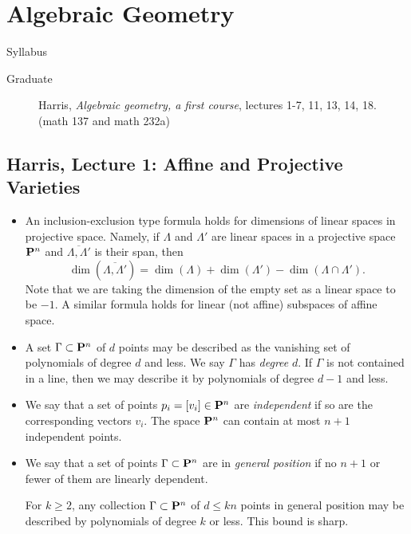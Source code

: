 \section{Algebraic Geometry}
\label{S:algebraic-geometry}

Syllabus
\begin{description}
\item[Graduate] Harris, \emph{Algebraic geometry, a first course}, lectures 1-7, 11, 13, 14, 18. (math 137 and math 232a)
\end{description}

\subsection{Harris, Lecture 1: Affine and Projective Varieties}

\begin{itemize}
\item
  An inclusion-exclusion type formula holds for dimensions of linear spaces in projective space. Namely, if $\Lambda$ and $\Lambda'$ are linear spaces in a projective space $\P^n$ and $\overline{\Lambda,\Lambda'}$ is their span, then
\[
\dim(\overline{\Lambda,\Lambda'}) = \dim(\Lambda) + \dim(\Lambda') - \dim(\Lambda \cap \Lambda').
\]
Note that we are taking the dimension of the empty set as a linear space to be $-1$. A similar formula holds for linear (not affine) subspaces of affine space.

\item
  A set $\Gamma \subset \P^n$ of $d$ points may be described as the vanishing set of polynomials of degree $d$ and less. We say $\Gamma$ has \emph{degree} $d$. If $\Gamma$ is not contained in a line, then we may describe it by polynomials of degree $d-1$ and less.

\item
  We say that a set of points $p_i = [v_i] \in \P^n$ are \emph{independent} if so are the corresponding vectors $v_i$. The space $\P^n$ can contain at most $n+1$ independent points.

\item
  We say that a set of points $\Gamma \subset \P^n$ are in \emph{general position} if no $n+1$ or fewer of them are linearly dependent.

  \begin{theorem}
    For $k \geq 2$, any collection $\Gamma \subset \P^n$ of $d \leq k n$ points in general position may be described by polynomials of degree $k$ or less. This bound is sharp.
  \end{theorem}
  

\end{itemize}
